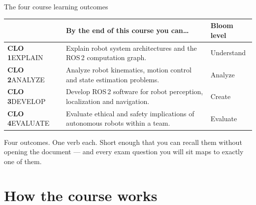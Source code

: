 \documentclass[aspectratio=169]{beamer}
\begin{document}
\begin{frame}{The four course learning outcomes}
  \small
  \begin{table}
    \begin{tabular}{@{}p{2.0cm}p{7.4cm}p{2.1cm}@{}}
      \toprule
      & \textbf{By the end of this course you can\ldots} & \textbf{Bloom level} \\
      \midrule
      \textbf{CLO 1}\newline EXPLAIN
        & Explain robot system architectures and the ROS\,2 computation graph.
        & Understand \\[0.3em]
      \textbf{CLO 2}\newline ANALYZE
        & Analyze robot kinematics, motion control and state estimation problems.
        & Analyze \\[0.3em]
      \textbf{CLO 3}\newline DEVELOP
        & Develop ROS\,2 software for robot perception, localization and navigation.
        & Create \\[0.3em]
      \textbf{CLO 4}\newline EVALUATE
        & Evaluate ethical and safety implications of autonomous robots within a team.
        & Evaluate \\
      \bottomrule
    \end{tabular}
  \end{table}

  \vspace{0.2em}
  Four outcomes. One verb each. Short enough that you can recall them without opening
  the document --- and every exam question you will sit maps to exactly one of them.
\end{frame}

\section{How the course works}
\end{document}
